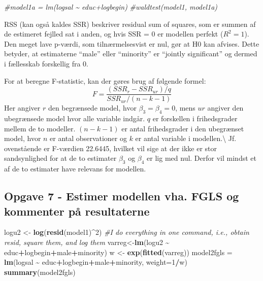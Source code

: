 \documentclass[
]{article}
\newenvironment{Shaded}{\begin{snugshade}}{\end{snugshade}}
\newcommand{\AttributeTok}[1]{\textcolor[rgb]{0.13,0.29,0.53}{#1}}
\newcommand{\CommentTok}[1]{\textcolor[rgb]{0.56,0.35,0.01}{\textit{#1}}}
\newcommand{\DecValTok}[1]{\textcolor[rgb]{0.00,0.00,0.81}{#1}}
\newcommand{\FunctionTok}[1]{\textcolor[rgb]{0.13,0.29,0.53}{\textbf{#1}}}
\newcommand{\NormalTok}[1]{#1}
\newcommand{\OtherTok}[1]{\textcolor[rgb]{0.56,0.35,0.01}{#1}}
\newcommand{\SpecialCharTok}[1]{\textcolor[rgb]{0.81,0.36,0.00}{\textbf{#1}}}
\begin{document}
\begin{Shaded}
\begin{Highlighting}[]
\CommentTok{\#model1a = lm(logsal \textasciitilde{} educ+logbegin)}
\CommentTok{\#waldtest(model1, model1a)}
\end{Highlighting}
\end{Shaded}

RSS (kan også kaldes SSR) beskriver residual sum of squares, som er
summen af de estimeret fejlled sat i anden, og hvis SSR = 0 er modellen
perfekt (\(R^2=1\)). Den meget lave p-værdi, som tilnærmelsesvist er
nul, gør at H0 kan afvises. Dette betyder, at estimaterne ``male'' eller
``minority'' er ``jointly significant'' og dermed i fællesskab
forskellig fra 0.

For at beregne F-statistic, kan der gøres brug af følgende formel:
\[F = \frac {(SSR_r - SSR_{ur}) /q}{SSR_{ur} / (n - k - 1)}\] Her
angiver \(r\) den begrænsede model, hvor \(\beta_3 = \beta_4 = 0\), mens
\(ur\) angiver den ubegrænsede model hvor alle variable indgår. \(q\) er
forskellen i frihedsgrader mellem de to modeller. \((n-k-1)\) er antal
frihedsgrader i den ubegrænset model, hvor \(n\) er antal observationer
og \(k\) er antal variable i modellen.\textbackslash{} Jf. ovenstående
er F-værdien 22.6445, hvilket vil sige at der ikke er stor sandsynlighed
for at de to estimater \(\beta_3\) og \(\beta_4\) er lig med nul. Derfor
vil mindst et af de to estimater have relevans for modellen.

\hypertarget{opgave-7---estimer-modellen-vha.-fgls-og-kommenter-puxe5-resultaterne}{%
\subsection{Opgave 7 - Estimer modellen vha. FGLS og kommenter på
resultaterne}\label{opgave-7---estimer-modellen-vha.-fgls-og-kommenter-puxe5-resultaterne}}

\begin{Shaded}
\begin{Highlighting}[]
\NormalTok{logu2 }\OtherTok{\textless{}{-}} \FunctionTok{log}\NormalTok{(}\FunctionTok{resid}\NormalTok{(model1)}\SpecialCharTok{\^{}}\DecValTok{2}\NormalTok{) }\CommentTok{\#I do everything in one command, i.e., obtain resid, square them, and log them}
\NormalTok{varreg}\OtherTok{\textless{}{-}}\FunctionTok{lm}\NormalTok{(logu2 }\SpecialCharTok{\textasciitilde{}}\NormalTok{ educ}\SpecialCharTok{+}\NormalTok{logbegin}\SpecialCharTok{+}\NormalTok{male}\SpecialCharTok{+}\NormalTok{minority)}
\NormalTok{w }\OtherTok{\textless{}{-}} \FunctionTok{exp}\NormalTok{(}\FunctionTok{fitted}\NormalTok{(varreg))}
\NormalTok{model2fgls }\OtherTok{=} \FunctionTok{lm}\NormalTok{(logsal }\SpecialCharTok{\textasciitilde{}}\NormalTok{ educ}\SpecialCharTok{+}\NormalTok{logbegin}\SpecialCharTok{+}\NormalTok{male}\SpecialCharTok{+}\NormalTok{minority, }\AttributeTok{weight=}\DecValTok{1}\SpecialCharTok{/}\NormalTok{w)}
\FunctionTok{summary}\NormalTok{(model2fgls)}
\end{Highlighting}
\end{Shaded}
\end{document}

